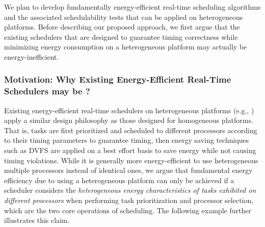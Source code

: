 We plan to develop fundamentally energy-efficient real-time scheduling algorithms and the associated schedulability tests that can be applied on heterogeneous platforms. Before describing our proposed approach, we first argue that the existing schedulers that are designed to guarantee timing correctness while minimizing energy consumption on a heterogeneous platform may actually be energy-inefficient.

\subsubsection{Motivation: Why Existing Energy-Efficient Real-Time Schedulers may be ?} \label{sec:step1Motivation}


Existing energy-efficient real-time schedulers on heterogeneous platforms (e.g., \cite{liuenergy, colin2014energy}) apply a similar design philosophy as those designed for homogeneous platforms. That is, tasks are first prioritized and scheduled to different processors according to their timing parameters to guarantee timing, then energy saving techniques such as DVFS are applied on a best effort basis to save energy while not causing timing violations. While it is generally more energy-efficient to use heterogeneous multiple processors instead of identical ones, we argue that fundamental energy efficiency due to using a heterogeneous platform can only be achieved if  a scheduler considers the \textit{heterogeneous energy characteristics of tasks exhibited on different processors} when performing task prioritization and processor selection, which are the two core operations of scheduling. The following example further illustrates this claim.




